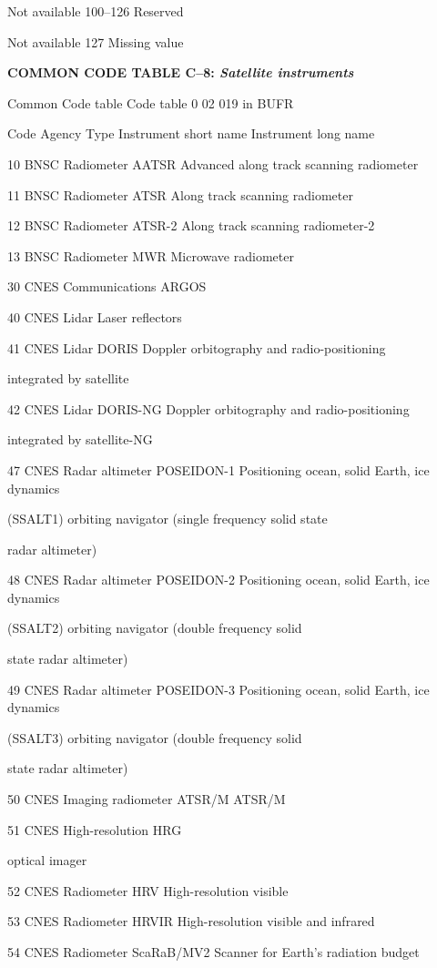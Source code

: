 Not available 100--126 Reserved

Not available 127 Missing value

\textbf{COMMON CODE TABLE C--8: \emph{Satellite instruments}}

Common Code table Code table 0 02 019 in BUFR

Code Agency Type Instrument short name Instrument long name

10 BNSC Radiometer AATSR Advanced along track scanning radiometer

11 BNSC Radiometer ATSR Along track scanning radiometer

12 BNSC Radiometer ATSR-2 Along track scanning radiometer-2

13 BNSC Radiometer MWR Microwave radiometer

30 CNES Communications ARGOS

40 CNES Lidar Laser reflectors

41 CNES Lidar DORIS Doppler orbitography and radio-positioning

integrated by satellite

42 CNES Lidar DORIS-NG Doppler orbitography and radio-positioning

integrated by satellite-NG

47 CNES Radar altimeter POSEIDON-1 Positioning ocean, solid Earth, ice dynamics

(SSALT1) orbiting navigator (single frequency solid state

radar altimeter)

48 CNES Radar altimeter POSEIDON-2 Positioning ocean, solid Earth, ice dynamics

(SSALT2) orbiting navigator (double frequency solid

state radar altimeter)

49 CNES Radar altimeter POSEIDON-3 Positioning ocean, solid Earth, ice dynamics

(SSALT3) orbiting navigator (double frequency solid

state radar altimeter)

50 CNES Imaging radiometer ATSR/M ATSR/M

51 CNES High-resolution HRG

optical imager

52 CNES Radiometer HRV High-resolution visible

53 CNES Radiometer HRVIR High-resolution visible and infrared

54 CNES Radiometer ScaRaB/MV2 Scanner for Earth's radiation budget

